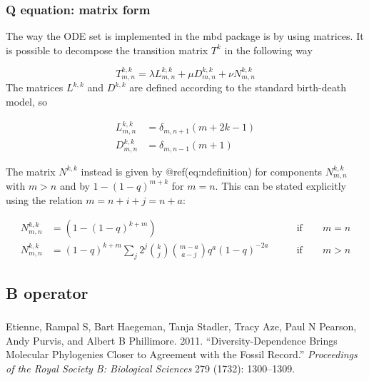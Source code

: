 \documentclass[]{article}
\begin{document}
\hypertarget{q-equation-matrix-form}{%
\subsubsection{Q equation: matrix form}\label{q-equation-matrix-form}}

The way the ODE set is implemented in the mbd package is by using matrices.
It is possible to decompose the transition matrix \(T^k\) in the following way

\[
T^{k,k}_{m,n} = \lambda L^{k,k}_{m,n} + \mu D^{k,k}_{m,n} + \nu N^{k,k}_{m,n}
\]
The matrices \(L^{k,k}\) and \(D^{k,k}\) are defined according to the standard birth-death
model, so

\[
\begin{aligned}
L^{k,k}_{m,n} & = \delta_{m, n + 1} (m + 2k - 1) \\
D^{k,k}_{m,n} & = \delta_{m, n - 1} (m + 1)
\end{aligned}
\]

The matrix \(N^{k,k}\) instead is given by @ref(eq:ndefinition) for components
\(N^{k,k}_{m,n}\) with \(m > n\) and by \(1 - (1 - q) ^ {m + k}\) for \(m = n\).
This can be stated explicitly using the relation \(m = n + i + j = n + a\):

\[
\begin{aligned}
N^{k,k}_{m,n} & =
(1 - (1 - q) ^ {k + m}) 
\qquad & \text{if} \qquad
m = n
\\
N^{k,k}_{m,n} & =
(1 - q) ^ {k + m}
\sum_j 2 ^ j \binom{k}{j} \binom{m - a}{a - j} q ^ a (1 - q) ^ {-2a}
\qquad & \text{if} \qquad
m > n
\end{aligned}
\]

\hypertarget{b-operator}{%
\subsection{B operator}\label{b-operator}}

\hypertarget{section}{%
\subsubsection*{}\label{section}}

\hypertarget{refs}{}
\leavevmode\hypertarget{ref-etienne2012diversity}{}%
Etienne, Rampal S, Bart Haegeman, Tanja Stadler, Tracy Aze, Paul N Pearson, Andy Purvis, and Albert B Phillimore. 2011. ``Diversity-Dependence Brings Molecular Phylogenies Closer to Agreement with the Fossil Record.'' \emph{Proceedings of the Royal Society B: Biological Sciences} 279 (1732): 1300--1309.
\end{document}
